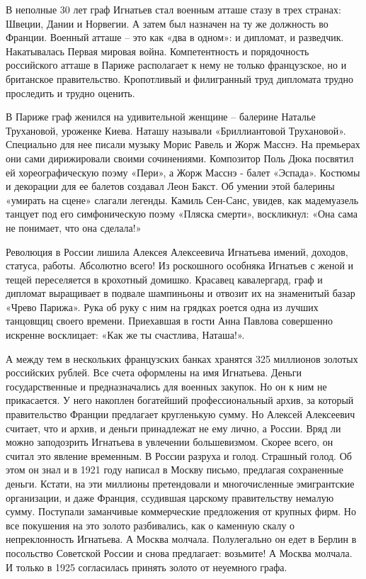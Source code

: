 В неполные 30 лет граф Игнатьев стал военным атташе стазу в трех странах:
Швеции, Дании и Норвегии. А затем был назначен на ту же должность во Франции.
Военный атташе – это как «два в одном»: и дипломат, и разведчик. Накатывалась
Первая мировая война. Компетентность и порядочность российского атташе в Париже
располагает к нему не только французское, но и британское правительство.
Кропотливый и филигранный труд дипломата трудно проследить и трудно оценить.

В Париже граф женился на удивительной женщине – балерине Наталье Трухановой,
уроженке Киева. Наташу называли «Бриллиантовой Трухановой». Специально для нее
писали музыку Морис Равель и Жорж Масснэ. На премьерах они сами дирижировали
своими сочинениями. Композитор Поль Дюка посвятил ей хореографическую поэму
«Пери», а Жорж Масснэ - балет «Эспада». Костюмы и декорации для ее балетов
создавал Леон Бакст. Об умении этой балерины «умирать на сцене» слагали
легенды. Камиль Сен-Санс, увидев, как мадемуазель танцует под его симфоническую
поэму «Пляска смерти», воскликнул: «Она сама не понимает, что она сделала!» 

Революция в России лишила Алексея Алексеевича Игнатьева имений, доходов,
статуса, работы. Абсолютно всего! Из роскошного особняка Игнатьев с женой и
тещей переселяется в крохотный домишко. Красавец кавалергард, граф и дипломат
выращивает в подвале шампиньоны и отвозит их на знаменитый базар «Чрево
Парижа». Рука об руку с ним на грядках роется одна из лучших танцовщиц своего
времени. Приехавшая в гости Анна Павлова совершенно искренне восклицает: «Как
же ты счастлива, Наташа!». 

А между тем в нескольких французских банках хранятся 325 миллионов золотых
российских рублей. Все счета оформлены на имя Игнатьева. Деньги государственные
и предназначались для военных закупок. Но он к ним не прикасается. У него
накоплен богатейший профессиональный архив, за который правительство Франции
предлагает кругленькую сумму. Но Алексей Алексеевич считает, что и архив, и
деньги принадлежат не ему лично, а России. Вряд ли можно заподозрить Игнатьева
в увлечении большевизмом. Скорее всего, он считал это явление временным. В
России разруха и голод. Страшный голод. Об этом он знал и в 1921 году написал в
Москву письмо, предлагая сохраненные деньги. Кстати, на эти миллионы
претендовали и многочисленные эмигрантские организации, и даже Франция,
ссудившая царскому правительству немалую сумму. Поступали заманчивые
коммерческие предложения от крупных фирм. Но все покушения на это золото
разбивались, как о каменную скалу о непреклонность Игнатьева. А Москва молчала.
Полулегально он едет в Берлин в посольство Советской России и снова предлагает:
возьмите! А Москва молчала. И только в 1925 согласилась принять золото от
неуемного графа. 

